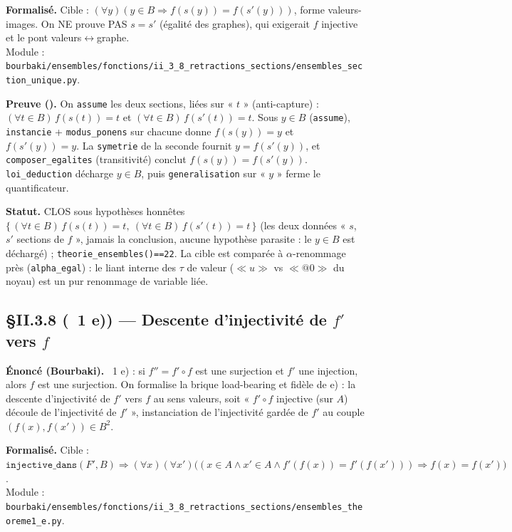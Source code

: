 \textbf{Formalisé.} Cible : $(\forall y)(y \in B \Rightarrow f(s(y)) = f(s'(y)))$, forme valeurs-images. On NE prouve PAS $s = s'$ (égalité des graphes), qui exigerait $f$ injective et le pont valeurs$\leftrightarrow$graphe. \\
Module : \texttt{bourbaki/ensembles/fonctions/ii\_3\_8\_retractions\_sections/ensembles\_section\_unique.py}.

\textbf{Preuve (\Nstar).} On \texttt{assume} les deux sections, liées sur « $t$ » (anti-capture) : $(\forall t\in B)\,f(s(t))=t$ et $(\forall t\in B)\,f(s'(t))=t$. Sous $y\in B$ (\texttt{assume}), \texttt{instancie} + \texttt{modus\_ponens} sur chacune donne $f(s(y))=y$ et $f(s'(y))=y$. La \texttt{symetrie} de la seconde fournit $y=f(s'(y))$, et \texttt{composer\_egalites} (transitivité) conclut $f(s(y))=f(s'(y))$. \texttt{loi\_deduction} décharge $y\in B$, puis \texttt{generalisation} sur « $y$ » ferme le quantificateur.

\textbf{Statut.} CLOS sous hypothèses honnêtes $\{\,(\forall t\in B)\,f(s(t))=t,\ (\forall t\in B)\,f(s'(t))=t\,\}$ (les deux données « $s$, $s'$ sections de $f$ », jamais la conclusion, aucune hypothèse parasite : le $y\in B$ est déchargé) ; \texttt{theorie\_ensembles()==22}. La cible est comparée à $\alpha$-renommage près (\texttt{alpha\_egal}) : le liant interne des $\tau$ de valeur ($\ll u \gg$ vs $\ll @0 \gg$ du noyau) est un pur renommage de variable liée.

\subsection{§II.3.8 (\theoreme~1 e)) --- Descente d'injectivité de $f'$ vers $f$}
\textbf{Énoncé (Bourbaki).} \theoreme~1 e) : si $f'' = f' \circ f$ est une surjection et $f'$ une injection, alors $f$ est une surjection. On formalise la brique load-bearing et fidèle de e) : la descente d'injectivité de $f'$ vers $f$ au sens valeurs, soit « $f' \circ f$ injective (sur $A$) découle de l'injectivité de $f'$ », instanciation de l'injectivité gardée de $f'$ au couple $(f(x), f(x')) \in B^2$.

\textbf{Formalisé.} Cible : $\texttt{injective\_dans}(F', B) \Rightarrow (\forall x)(\forall x')\bigl((x \in A \wedge x' \in A \wedge f'(f(x)) = f'(f(x'))) \Rightarrow f(x) = f(x')\bigr)$. \\
Module : \texttt{bourbaki/ensembles/fonctions/ii\_3\_8\_retractions\_sections/ensembles\_theoreme1\_e.py}.


